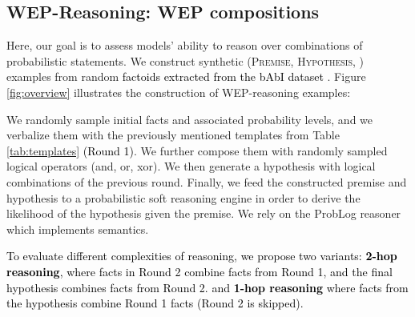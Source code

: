 \documentclass[11pt]{article}
\def \thecolor {black}
\newcommand{\blue}[1]{\textcolor{\thecolor}{#1}}
\begin{document}
\subsection{WEP-Reasoning: WEP compositions}  
Here, our goal is to assess models' ability to reason over combinations of probabilistic statements. We construct synthetic (\textsc{Premise}, \textsc{Hypothesis}, ) examples from random \blue{factoids extracted from the bAbI dataset \citep{weston2015towards}}. Figure \ref{fig:overview} illustrates the construction of WEP-reasoning examples:

We randomly sample initial facts and associated probability levels, and we verbalize them with the previously mentioned templates from Table \ref{tab:templates} \blue{(Round 1)}.
We further compose them with randomly sampled logical operators (and, or, xor). We then generate a hypothesis with logical combinations of the previous round. Finally, we feed the constructed premise and hypothesis to a probabilistic soft reasoning engine in order to derive the likelihood of the hypothesis given the premise. We rely on the ProbLog \cite{de2007problog} reasoner which implements \citet{Dantsin} semantics.

\blue{To evaluate different complexities of reasoning, we propose two variants: \textbf{2-hop reasoning}, where facts in Round 2 combine facts from Round 1, and the final hypothesis combines facts from Round 2. and \textbf{1-hop reasoning} where facts from the hypothesis combine Round 1 facts (Round 2 is skipped).}
\end{document}
